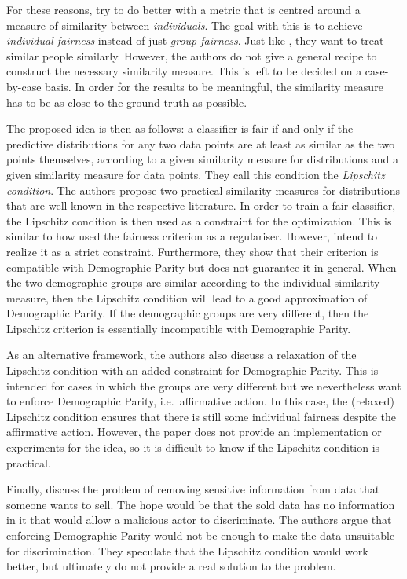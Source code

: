 For these reasons, \citet{dwork2012fairness} try to do better with a metric
that is centred around a measure of similarity between \emph{individuals}.
The goal with this is to achieve \emph{individual fairness} instead of just \emph{group fairness}.
Just like \citet{luong2011k}, they want to treat similar people similarly.
However, the authors do not give a general recipe to construct the necessary similarity measure.
This is left to be decided on a case-by-case basis.
In order for the results to be meaningful,
the similarity measure has to be as close to the ground truth as possible.

The proposed idea is then as follows: a classifier is fair
if and only if the predictive distributions for any two data points
are at least as similar as the two points themselves,
according to a given similarity measure for distributions
and a given similarity measure for data points.
They call this condition the \emph{Lipschitz condition}.
The authors propose two practical similarity measures for distributions
that are well-known in the respective literature.
In order to train a fair classifier,
the Lipschitz condition is then used as a constraint for the optimization.
This is similar to how \citet{kamishima2012fairness} used the fairness criterion as a regulariser.
However, \citet{dwork2012fairness} intend to realize it as a strict constraint.
Furthermore, they show that their criterion is compatible with Demographic Parity
but does not guarantee it in general.
When the two demographic groups are similar according to the individual similarity measure,
then the Lipschitz condition will lead to a good approximation of Demographic Parity.
If the demographic groups are very different,
then the Lipschitz criterion is essentially incompatible with Demographic Parity.

As an alternative framework,
the authors also discuss a relaxation of the Lipschitz condition with an added constraint for Demographic Parity.
This is intended for cases in which the groups are very different
but we nevertheless want to enforce Demographic Parity, i.e.~affirmative action.
In this case, the (relaxed) Lipschitz condition ensures
that there is still some individual fairness despite the affirmative action.
However, the paper does not provide an implementation or experiments for the idea,
so it is difficult to know if the Lipschitz condition is practical.

Finally, \citet{dwork2012fairness} discuss the problem of removing sensitive information
from data that someone wants to sell.
The hope would be that the sold data has no information in it
that would allow a malicious actor to discriminate.
The authors argue that enforcing Demographic Parity would not be enough
to make the data unsuitable for discrimination.
They speculate that the Lipschitz condition would work better,
but ultimately do not provide a real solution to the problem.

